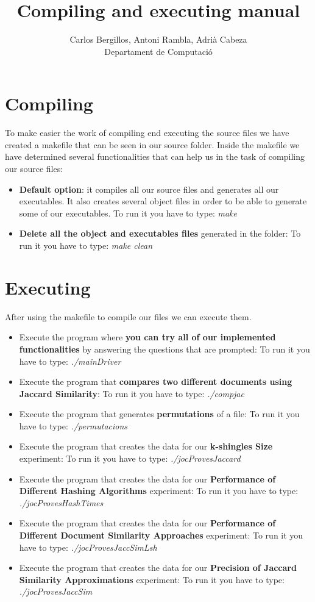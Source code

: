 \documentclass[12pt]{article}
\author{Carlos Bergillos, Antoni Rambla, Adrià Cabeza\\ Departament de Computació}
\title{Compiling and executing manual}
\begin{document}
  \maketitle  
   \newpage
   \section{Compiling}
   To make easier the work of compiling end executing the source files we have created a makefile that can be seen in our source folder. Inside the makefile we have determined several functionalities that can help us in the task of compiling our source files:
   
   \begin{itemize}
   \item \textbf{Default option}: it compiles all our source files and generates all our executables. It also creates several object files in order to be able to generate some of our executables. 
   To run it you have to type: \textit{make}
   \item \textbf{Delete all the object and executables files} generated in the folder:
   To run it you have to type: \textit{make clean}
   \end{itemize}
      \section{Executing}
         After using the makefile to compile our files we can execute them.
            
   \begin{itemize}
   
   \item Execute the program where \textbf{you can try all of our implemented functionalities} by answering the questions that are prompted:
   To run it you have to type: \textit{./mainDriver}
   
           \item Execute the program that \textbf{compares two different documents using Jaccard Similarity}:
   To run it you have to type: \textit{./compjac}
  

   \item Execute the program that generates \textbf{permutations} of a file:
   To run it you have to type: \textit{./permutacions}
    
    \item Execute the program that creates the data for our \textbf{k-shingles Size} experiment:
   To run it you have to type: \textit{./jocProvesJaccard}
\item Execute the program that creates the data for our \textbf{Performance of Different Hashing Algorithms} experiment:
   To run it you have to type: \textit{./jocProvesHashTimes}
\item Execute the program that creates the data for our \textbf{Performance of Different Document Similarity Approaches} experiment:
   To run it you have to type: \textit{./jocProvesJaccSimLsh}
   \item Execute the program that creates the data for our \textbf{Precision of Jaccard Similarity Approximations} experiment:
   To run it you have to type: \textit{./jocProvesJaccSim}
   
      \end{itemize}
\end{document}

